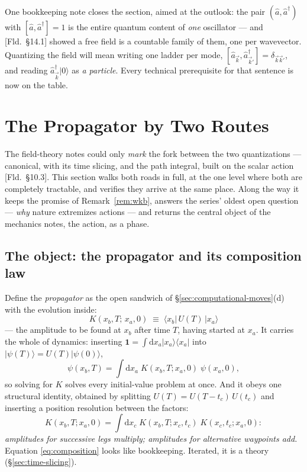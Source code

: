 \documentclass[11pt]{article}
\theoremstyle{plain}
\theoremstyle{definition}
\theoremstyle{remark}
\newcommand{\dd}{\mathrm{d}}
\newcommand{\op}[1]{\hat{#1}}
\newcommand{\idop}{\mathbf{1}}  %
\newcommand{\ket}[1]{\lvert #1 \rangle}
\newcommand{\bra}[1]{\langle #1 \rvert}
\begin{document}
\medskip
\noindent
One bookkeeping note closes the section, aimed at the outlook: the
pair $(\op a, \op a^\dagger)$ with $[\op a, \op a^\dagger] = 1$ is
the entire quantum content of \emph{one} oscillator --- and
[Fld.\ \S14.1] showed a free field is a countable family of them,
one per wavevector. Quantizing the field will mean writing one
ladder per mode, $[\op a_{\vec k}, \op a^\dagger_{\vec k'}] =
\delta_{\vec k\vec k'}$, and reading $\op a^\dagger_{\vec k}\ket 0$
as \emph{a particle}. Every technical prerequisite for that sentence
is now on the table.


\section{The Propagator by Two Routes}
\label{sec:path-integral}

The field-theory notes could only \emph{mark} the fork between the
two quantizations --- canonical, with its time slicing, and the path
integral, built on the scalar action [Fld.\ \S10.3]. This section
walks both roads in full, at the one level where both are completely
tractable, and verifies they arrive at the same place. Along the
way it keeps the promise of Remark~\ref{rem:wkb}, answers the
series' oldest open question --- \emph{why} nature extremizes
actions --- and returns the central object of the mechanics notes,
the action, as a phase.

\subsection{The object: the propagator and its composition law}
\label{sec:propagator-def}

Define the \emph{propagator} as the open sandwich of
\S\ref{sec:computational-moves}(d) with the evolution inside:
\begin{equation}
  \boxed{\;
  K(x_b, T;\, x_a, 0)
  \;\equiv\;
  \bra{x_b}\,U(T)\,\ket{x_a}
  \;}
  \label{eq:propagator-def}
\end{equation}
--- the amplitude to be found at $x_b$ after time $T$, having
started at $x_a$. It carries the whole of dynamics: inserting
$\idop = \int\dd x_a\ket{x_a}\bra{x_a}$ into
$\ket{\psi(T)} = U(T)\ket{\psi(0)}$,
\begin{equation}
  \psi(x_b, T)
  = \int\dd x_a\;
    K(x_b, T; x_a, 0)\;\psi(x_a, 0),
\end{equation}
so solving for $K$ solves every initial-value problem at once. And
it obeys one structural identity, obtained by splitting
$U(T) = U(T - t_c)\,U(t_c)$ and inserting a position resolution
between the factors:
\begin{equation}
  K(x_b, T; x_a, 0)
  = \int\dd x_c\;
    K(x_b, T; x_c, t_c)\;
    K(x_c, t_c; x_a, 0) :
  \label{eq:composition}
\end{equation}
\emph{amplitudes for successive legs multiply; amplitudes for
alternative waypoints add.} Equation \eqref{eq:composition} looks
like bookkeeping. Iterated, it is a theory
(\S\ref{sec:time-slicing}).
\end{document}
